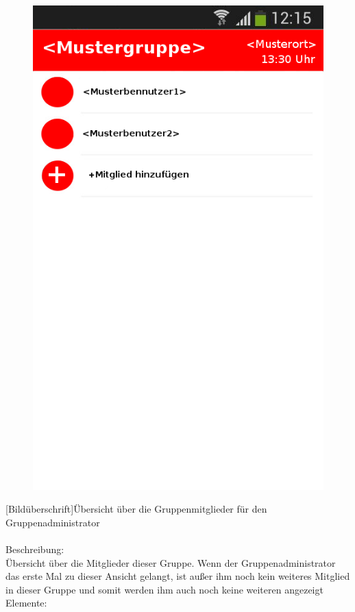 \begin{figure}
	\includegraphics[scale =1]{resources/images/gruppendetails_Admin.png}
\end{figure}
[Bildüberschrift]Übersicht über die Gruppenmitglieder für den Gruppenadministrator\\ \\
[Kleinüberschrift]Beschreibung:\\
Übersicht über die Mitglieder dieser Gruppe. Wenn der Gruppenadministrator das erste Mal zu dieser Ansicht gelangt, ist außer ihm noch kein weiteres Mitglied in dieser Gruppe und somit werden ihm auch noch keine weiteren angezeigt\\
[Kleinüberschrift]Elemente:\\

